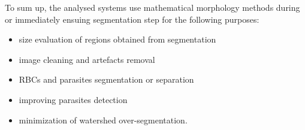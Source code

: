 \documentclass[sensors,review,submit,moreauthors,pdftex,10pt,a4paper]{mdpi}
\begin{document}
To sum up, the analysed systems use mathematical morphology methods during or immediately ensuing segmentation step for the following purposes:

\begin{itemize}
	\item size evaluation of regions obtained from segmentation
	\item image cleaning and artefacts removal
	\item RBCs and parasites segmentation or separation
	\item improving parasites detection
	\item minimization of watershed over-segmentation.
\end{itemize}

\end{document}
